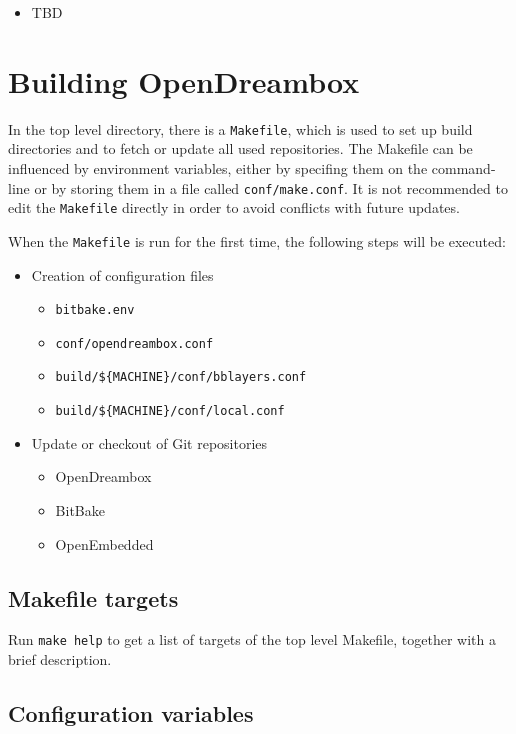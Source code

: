\documentclass[a4paper]{article}
\newcommand{\shell}[1]{\texttt{\small #1}}
\begin{document}
  \begin{itemize}
    \item TBD
  \end{itemize}

\pagebreak

\section{Building OpenDreambox}

  In the top level directory, there is a \shell{Makefile}, which is used to
  set up build directories and to fetch or update all used repositories.
  The Makefile can be influenced by environment variables, either
  by specifing them on the command-line or by storing them in a file called
  \shell{conf/make.conf}. It is not recommended to edit the \shell{Makefile} directly
  in order to avoid conflicts with future updates.

  When the \shell{Makefile} is run for the first time, the following steps will
  be executed:

  \begin{itemize}
    \item Creation of configuration files
      \begin{itemize}
        \item \shell{bitbake.env}
        \item \shell{conf/opendreambox.conf}
        \item \shell{build/\$\{MACHINE\}/conf/bblayers.conf}
        \item \shell{build/\$\{MACHINE\}/conf/local.conf}
      \end{itemize}
    \item Update or checkout of Git repositories
      \begin{itemize}
        \item OpenDreambox
        \item BitBake
        \item OpenEmbedded
      \end{itemize}
  \end{itemize}

  \subsection{Makefile targets}
    Run \shell{make help} to get a list of targets of the top level Makefile, together with a brief description.

  \subsection{Configuration variables}
\end{document}
